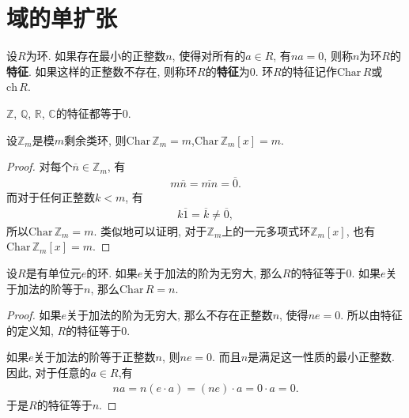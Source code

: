 \documentclass[../../main.tex]{subfiles}%
\begin{document}
\section{域的单扩张}

\begin{definition}[环的特征]
设$R$为环. 如果存在最小的正整数$n$, 使得对所有的$a \in R$, 有$na = 0$, 则称$n$为环$R$的\textbf{特征}. 如果这样的正整数不存在, 则称环$R$的\textbf{特征}为0. 环$R$的特征记作$\mathrm{Char}\, R$或$\text{ch}\,R.$
\end{definition}

\begin{example}
$\mathbb{Z}$, $\mathbb{Q}$, $\mathbb{R}$, $\mathbb{C}$的特征都等于0.
\end{example}

\begin{proposition}\label{proposition:模m剩余类环及其多项式环的特征就是m}
设$\mathbb{Z}_m$是模$m$剩余类环, 则$\mathrm{Char}\,\mathbb{Z}_m = m$,$\mathrm{Char}\,\mathbb{Z}_m[x] = m$.
\end{proposition}
\begin{proof}

对每个$\overline{n} \in \mathbb{Z}_m$, 有
\begin{align*}
m\overline{n} = \overline{mn} = \overline{0}.
\end{align*}
而对于任何正整数$k < m$, 有
\begin{align*}
k\overline{1} = \overline{k} \neq \overline{0},
\end{align*}
所以$\mathrm{Char}\,\mathbb{Z}_m = m$. 类似地可以证明, 对于$\mathbb{Z}_m$上的一元多项式环$\mathbb{Z}_m[x]$, 也有$\mathrm{Char}\,\mathbb{Z}_m[x] = m$.

\end{proof}

\begin{theorem}\label{theorem:环的特征的基本性质-1}
设$R$是有单位元$e$的环. 如果$e$关于加法的阶为无穷大, 那么$R$的特征等于0. 如果$e$关于加法的阶等于$n$, 那么$\mathrm{Char}\, R = n$.
\end{theorem}
\begin{proof}

如果$e$关于加法的阶为无穷大, 那么不存在正整数$n$, 使得$ne = 0$. 所以由特征的定义知, $R$的特征等于0.

如果$e$关于加法的阶等于正整数$n$, 则$ne = 0$. 而且$n$是满足这一性质的最小正整数. 因此, 对于任意的$a \in R$,有
\begin{align*}
na = n(e \cdot a) = (ne) \cdot a = 0 \cdot a = 0.
\end{align*}
于是$R$的特征等于$n$.

\end{proof}
\end{document}
